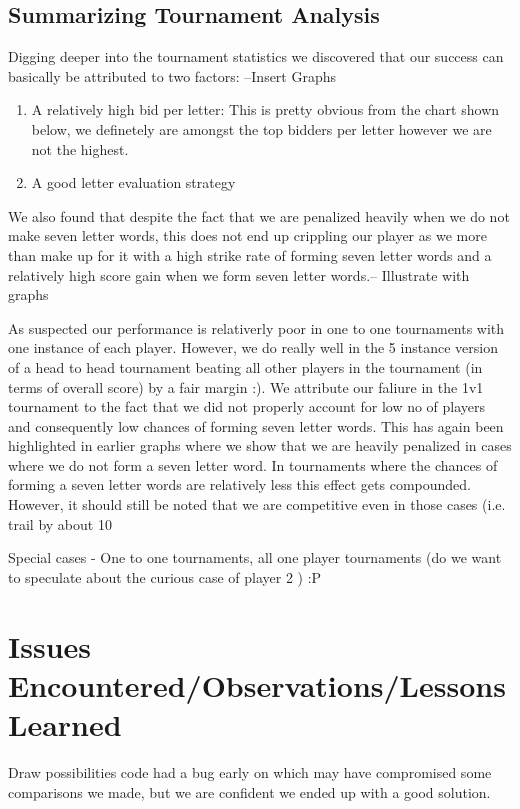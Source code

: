 \documentclass[11pt]{article}
\begin{document}
	\subsection{Summarizing Tournament Analysis}
		
	Digging deeper into the tournament statistics we discovered that our success can basically be attributed to two factors:
	--Insert Graphs
	\begin{enumerate}
	\item{} A relatively high bid per letter: This is pretty obvious from the chart shown below, we definetely are amongst the top bidders per letter however we are not the highest.
	\item{} A good letter evaluation strategy
\end{enumerate}
	
	We also found that despite the fact that we are penalized heavily when we do not make seven letter words, this does not end up crippling our player as we more than make up for it with a high strike rate of forming seven letter words and a relatively high score gain when we form seven letter words.-- Illustrate with graphs
	
	As suspected our performance is relativerly poor in one to one tournaments with one instance of each player. However, we do really well in the 5 instance version of a head to head tournament beating all other players in the tournament (in terms of overall score) by a fair margin :). We attribute our faliure in the 1v1 tournament to the fact that we did not properly account for low no of players and consequently low chances of forming seven letter words. This has again been highlighted in earlier graphs where we show that we are heavily penalized in cases where we do not form a seven letter word. In tournaments where the chances of forming a seven letter words are relatively less this effect gets compounded. However, it should still be noted that we are competitive even in those cases (i.e. trail by about 10%
	
Special cases - One to one tournaments, all one player tournaments (do we want to speculate about the curious case of player 2 ) :P

\section{Issues Encountered/Observations/Lessons Learned}

Draw possibilities code had a bug early on which may have compromised some comparisons we made, but we are confident we ended up with a good solution.
\end{document}
